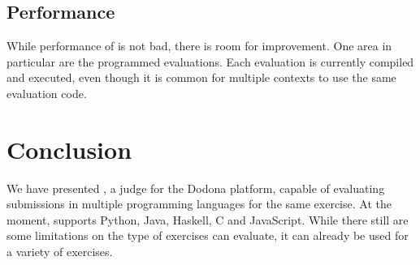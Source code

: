 \documentclass[5p,number]{elsarticle}
\begin{document}
    \subsection{Performance}\label{subsec:performance}

    While performance of \tested{} is not bad, there is room for improvement.
    One area in particular are the programmed evaluations.
    Each evaluation is currently compiled and executed, even though it is common for multiple contexts to use the same evaluation code.
    
    \section{Conclusion}\label{sec:conclusion}
    
    We have presented \tested{}, a judge for the Dodona platform, capable of evaluating submissions in multiple programming languages for the same exercise.
    At the moment, \tested{} supports Python, Java, Haskell, C and JavaScript.
    While there still are some limitations on the type of exercises \tested{} can evaluate, it can already be used for a variety of exercises.

    
    
\end{document}
